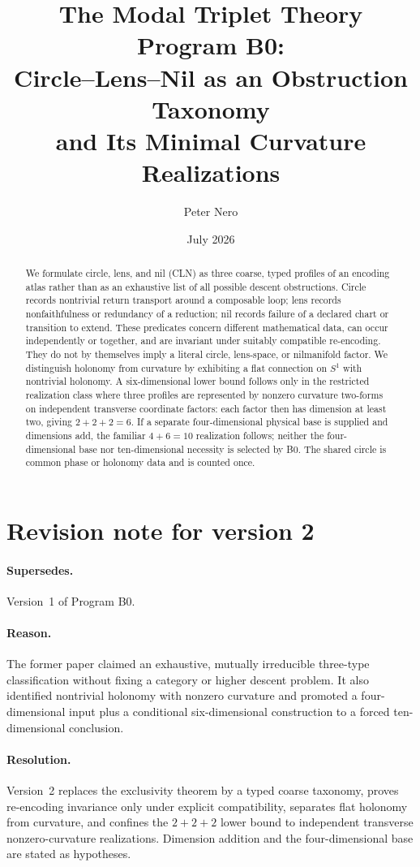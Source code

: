 \documentclass[11pt]{article}
\title{The Modal Triplet Theory Program B0:\\
Circle--Lens--Nil as an Obstruction Taxonomy\\
and Its Minimal Curvature Realizations}
\author{Peter Nero}
\date{July 2026}
\begin{document}
\maketitle

\begin{abstract}
We formulate circle, lens, and nil (CLN) as three coarse, typed profiles of an
encoding atlas rather than as an exhaustive list of all possible descent
obstructions.  Circle records nontrivial return transport around a composable
loop; lens records nonfaithfulness or redundancy of a reduction; nil records
failure of a declared chart or transition to extend.  These predicates concern
different mathematical data, can occur independently or together, and are
invariant under suitably compatible re-encoding.  They do not by themselves
imply a literal circle, lens-space, or nilmanifold factor.  We distinguish
holonomy from curvature by exhibiting a flat connection on $S^1$ with
nontrivial holonomy.  A six-dimensional lower bound follows only in the
restricted realization class where three profiles are represented by
nonzero curvature two-forms on independent transverse coordinate factors:
each factor then has dimension at least two, giving $2+2+2=6$.  If a separate
four-dimensional physical base is supplied and dimensions add, the familiar
$4+6=10$ realization follows; neither the four-dimensional base nor
ten-dimensional necessity is selected by B0.  The shared circle is common
phase or holonomy data and is counted once.
\end{abstract}

\section*{Revision note for version 2}
\paragraph{Supersedes.}
Version~1 of Program B0.
\paragraph{Reason.}
The former paper claimed an exhaustive, mutually irreducible three-type
classification without fixing a category or higher descent problem.  It also
identified nontrivial holonomy with nonzero curvature and promoted a
four-dimensional input plus a conditional six-dimensional construction to a
forced ten-dimensional conclusion.
\paragraph{Resolution.}
Version~2 replaces the exclusivity theorem by a typed coarse taxonomy, proves
re-encoding invariance only under explicit compatibility, separates flat
holonomy from curvature, and confines the $2+2+2$ lower bound to independent
transverse nonzero-curvature realizations.  Dimension addition and the
four-dimensional base are stated as hypotheses.
\end{document}
